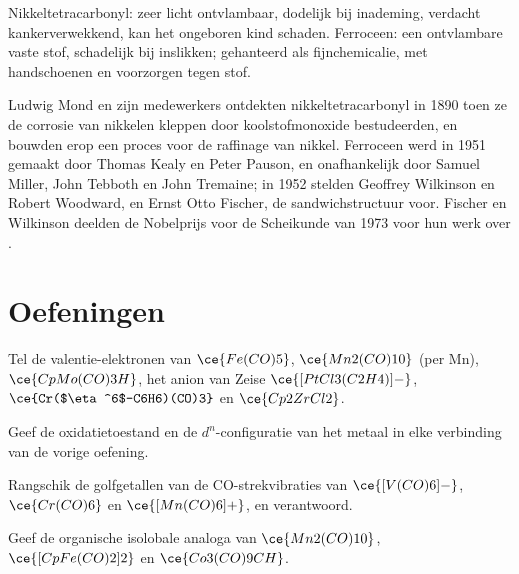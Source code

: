 \begin{safety}{}
Nikkeltetracarbonyl: zeer licht ontvlambaar, dodelijk bij inademing,
verdacht kankerverwekkend, kan het ongeboren kind schaden. Ferroceen:
een ontvlambare vaste stof, schadelijk bij inslikken; gehanteerd als
fijnchemicalie, met handschoenen en voorzorgen tegen stof.
\end{safety}

\begin{history}
Ludwig Mond en zijn medewerkers ontdekten nikkeltetracarbonyl in 1890
toen ze de corrosie van nikkelen kleppen door koolstofmonoxide
bestudeerden, en bouwden erop een proces voor de raffinage van nikkel.
Ferroceen werd in 1951 gemaakt door Thomas Kealy en Peter
Pauson, en onafhankelijk door Samuel Miller, John Tebboth en John
Tremaine; in 1952 stelden Geoffrey Wilkinson en Robert Woodward, en Ernst
Otto Fischer, de sandwichstructuur voor. Fischer en Wilkinson deelden de
Nobelprijs voor de Scheikunde van 1973 voor hun werk over
.
\end{history}

\section{Oefeningen}

\begin{exercise}[$\star$]\label{exo:b3:organometallic-bonding:1}
Tel de valentie-elektronen van $\ce{Fe(CO)5}$, $\ce{Mn2(CO)10}$ (per Mn), $\ce{CpMo(CO)3H}$, het anion van Zeise
$\ce{[PtCl3(C2H4)]-}$, $\ce{Cr($\eta^6$-C6H6)(CO)3}$ en $\ce{Cp2ZrCl2}$.
\end{exercise}

\begin{exercise}[$\star$]\label{exo:b3:organometallic-bonding:2}
Geef de oxidatietoestand en de $d^n$-configuratie van het metaal in elke
verbinding van de vorige oefening.
\end{exercise}

\begin{exercise}[$\star$]\label{exo:b3:organometallic-bonding:3}
Rangschik de golfgetallen van de CO-strekvibraties van $\ce{[V(CO)6]-}$, $\ce{Cr(CO)6}$ en $\ce{[Mn(CO)6]+}$, en verantwoord.
\end{exercise}

\begin{exercise}[$\star$]\label{exo:b3:organometallic-bonding:4}
Geef de organische isolobale analoga van $\ce{Mn2(CO)10}$, $\ce{[CpFe(CO)2]2}$ en $\ce{Co3(CO)9CH}$.
\end{exercise}

